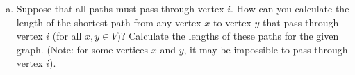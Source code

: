 \documentclass[../report/main.tex]{subfiles}
\begin{document}
\begin{enumerate}[a)]
	\item Suppose that all paths must pass through vertex $i$. How can you calculate the length of the shortest path from any vertex $x$ to vertex $y$ that pass through vertex $i$ (for all $x, y \in V$)? Calculate the lengths of these paths for the given graph. (Note: for some vertices $x$ and $y$, it may be impossible to pass through vertex $i$).
\end{enumerate}
\end{document}
